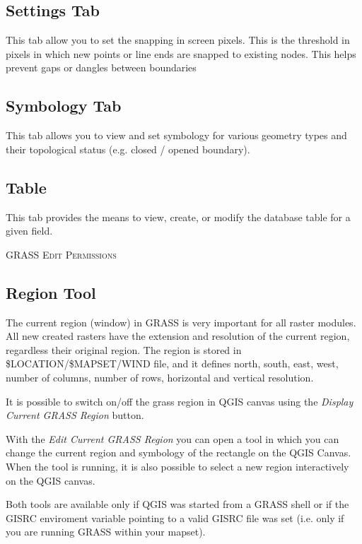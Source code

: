 \subsection{Settings Tab} 
This tab allow you to set the snapping in screen pixels. This is the threshold in pixels in which new points or line ends are snapped to existing nodes. This helps prevent gaps or dangles between boundaries

\subsection{Symbology Tab}
This tab allows you to view and set symbology for various geometry types and their topological status (e.g. closed / opened boundary).

\subsection{Table} 
This tab provides the means to view, create, or modify the database table for a given field.
\begin{Tip}\caption{\textsc{GRASS Edit Permissions}}
\end{Tip} 

\subsection{Region Tool}

The current region (window) in GRASS is very important for all 
raster modules. All new created rasters have the extension and resolution
of the current region, regardless their original region. 
The region is stored in \$LOCATION/\$MAPSET/WIND file, and it defines
north, south, east, west, number of columns, number of rows, 
horizontal and vertical resolution.

It is possible to switch on/off the grass region in QGIS canvas
using the \textsl{Display Current GRASS Region}
button. 

With the \textsl{Edit Current GRASS Region} you can open a tool 
in which you can change the current region and symbology
of the rectangle on the QGIS Canvas. When the tool is running,
it is also possible to select a new region interactively
on the QGIS canvas.

Both tools are available only if QGIS was started from a GRASS 
shell or if the GISRC enviroment variable pointing to a
valid GISRC file was set (i.e. only if you are running 
GRASS within your mapset).

